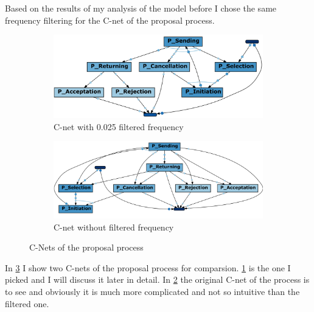 Based on the results of my analysis of the model before I chose the same frequency filtering for the C-net of the proposal process.
\begin{figure}[!htbp]
\centering
\begin{subfigure}{0.8\textwidth}
\includegraphics[height = 0.2\textheight]{PropC-Net0-024.PNG}
\caption{C-net with 0.025 filtered frequency}
\label{fig:cnetP0-025}
\end{subfigure}
\begin{subfigure}{0.8\textwidth}
\includegraphics[height = 0.2\textheight]{PropC-Net0.PNG}
\caption{C-net without filtered frequency}
\label{fig:cnetP0}
\end{subfigure}
\caption{C-Nets of the proposal process}
\label{fig:cNetP}
\end{figure}

In \ref{fig:cNetP} I show two C-nets of the proposal process for comparsion. \ref{fig:cnetP0-025} is the one I picked and I will discuss it later in detail. In \ref{fig:cnetP0} the original C-net of the process is to see and obviously it is much more complicated and not so intuitive than the filtered one. 

